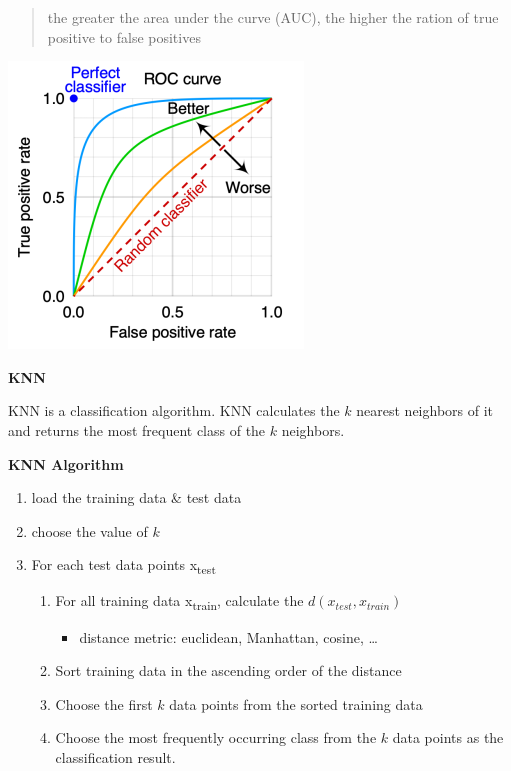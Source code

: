 \documentclass[11pt,twoside,landscape]{article}
\begin{document}
\begin{multicols}{3}
\begin{quote}
the greater the area under the curve (AUC), the higher the ration of true positive to false positives
\end{quote}


\begin{center}
\includegraphics[width=.9\linewidth]{img/roc.png}
\end{center}


\textbf{KNN}

KNN is a classification algorithm.
KNN calculates the \(k\) nearest neighbors of it and returns the most frequent class of the \(k\) neighbors.


\textbf{KNN Algorithm}

\begin{enumerate}
\item load the training data \& test data
\item choose the value of \(k\)
\item For each test data points x\textsubscript{test}
\begin{enumerate}
\item For all training data x\textsubscript{train}, calculate the \(d(x_{test}, x_{train})\)
\begin{itemize}
\item distance metric: euclidean, Manhattan, cosine, \ldots{}
\end{itemize}
\item Sort training data in the ascending order of the distance
\item Choose the first \(k\) data points from the sorted training data
\item Choose the most frequently occurring class from the \(k\) data points as the classification result.
\end{enumerate}
\end{enumerate}



\end{multicols}
\end{document}
